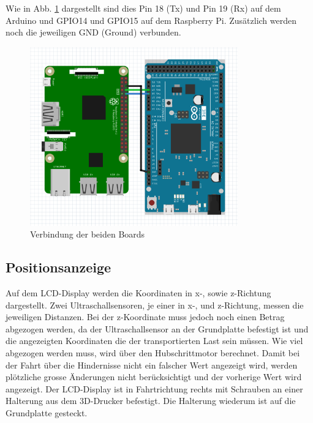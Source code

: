 \documentclass[a4paper]{report}
\begin{document}
Wie in Abb. \ref{fig:SchemaKommunikation} dargestellt sind dies Pin 18 (Tx) und Pin 19 (Rx) auf dem Arduino und GPIO14 und GPIO15 auf dem Raspberry Pi. Zusätzlich werden noch die jeweiligen GND (Ground) verbunden.
\begin{figure}[h!]
	\centering
	\includegraphics[keepaspectratio, width=0.8\textwidth]{SchemaKommunikationArduinoRaspbiScreenshot}
	\caption{Verbindung der beiden Boards}

	\label{fig:SchemaKommunikation}
\end{figure}



\subsection{Positionsanzeige}
\label{ssec:Positionsanzeige}

Auf dem LCD-Display werden die Koordinaten in x-, sowie z-Richtung dargestellt. Zwei Ultraschallsensoren, je einer in x-, und z-Richtung, messen die jeweiligen Distanzen. Bei der z-Koordinate muss jedoch noch einen Betrag abgezogen werden, da der Ultraschallsensor an der Grundplatte befestigt ist und die angezeigten Koordinaten die der transportierten Last sein müssen. Wie viel abgezogen werden muss, wird über den Hubschrittmotor berechnet. Damit bei der Fahrt über die Hindernisse nicht ein falscher Wert angezeigt wird, werden plötzliche grosse Änderungen nicht berücksichtigt und der vorherige Wert wird angezeigt. Der LCD-Display ist in Fahrtrichtung rechts mit Schrauben an einer Halterung aus dem 3D-Drucker befestigt. Die Halterung wiederum ist auf die Grundplatte gesteckt.

\newpage
\end{document}
